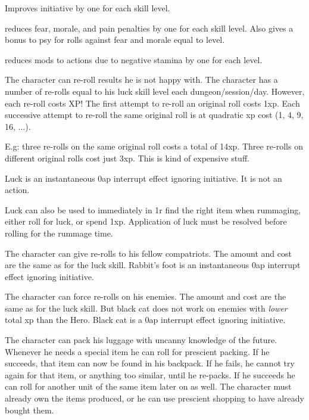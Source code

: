  Improves initiative by one for each skill level.


 reduces fear, morale, and pain penalties by one for each skill level. Also gives a bonus to psy for rolls against fear and morale equal to level.


 reduces mods to actions due to negative stamina by one for each level.


 The character can re-roll results he is not happy with. The character has a number of re-rolls equal to his luck skill level each dungeon/session/day. However, each re-roll costs XP! The first attempt to re-roll an original roll costs 1xp. Each successive attempt to re-roll the same original roll is at quadratic xp cost (1, 4, 9, 16, ...).

E.g: three re-rolls on the same original roll costs a total of 14xp. Three re-rolls on different original rolls cost just 3xp. This is kind of expensive stuff.

Luck is an instantaneous 0ap interrupt effect ignoring initiative. It is not an action.

Luck can also be used to immediately in 1r find the right item when rummaging, either roll for luck, or spend 1xp. Application of luck must be resolved before rolling for the rummage time.


 The character can give re-rolls to his fellow compatriots. The amount and cost are the same as for the luck skill.
Rabbit's foot is an instantaneous 0ap interrupt effect ignoring initiative.


 The character can force re-rolls on his enemies. The amount and cost are the same as for the luck skill. But black cat does not work on enemies with \emph{lower} total xp than the Hero.
Black cat is a 0ap interrupt effect ignoring initiative.



 The character can pack his luggage with uncanny knowledge of the future. Whenever he needs a special item he can roll for prescient packing. If he succeeds, that item can now be found in his backpack. If he fails, he cannot try again for that item, or anything too similar, until he re-packs. If he succeeds he can roll for another unit of the same item later on as well.
The character must already own the items produced, or he can use prescient shopping to have already bought them.

